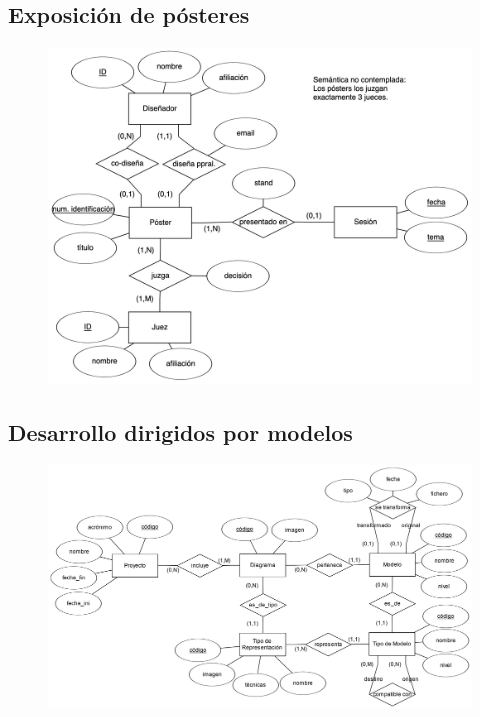 \documentclass{db-practice}
\begin{document}
\subsection{Exposición de pósteres}
\begin{figure}[H]
    \centering
    \includegraphics[width=\textwidth]{figs/modelado/ejercicio-12}
\end{figure}

\subsection{Desarrollo dirigidos por modelos}
\begin{figure}[H]
    \centering
    \includegraphics[width=\textwidth]{figs/modelado/ejercicio-13}
\end{figure}
\end{document}
